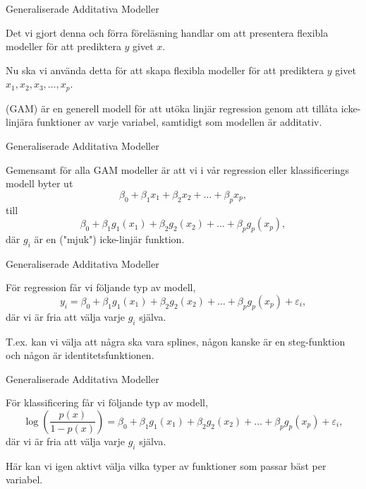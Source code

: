 \documentclass[10pt,english]{beamer}
\begin{document}
\begin{frame}{Generaliserade Additativa Modeller}

    Det vi gjort denna och förra föreläsning handlar om att presentera flexibla modeller för att prediktera $y$ givet $x$.
    
    Nu ska vi använda detta för att skapa flexibla modeller för att prediktera $y$ givet $x_1, x_2, x_3, \ldots, x_p$.

    \begin{greenbox}
         (GAM) är en generell modell för att utöka linjär regression genom att tillåta icke-linjära funktioner av varje variabel, samtidigt som modellen är additativ.
    \end{greenbox}
    
\end{frame}

\begin{frame}{Generaliserade Additativa Modeller}
    
    Gemensamt för alla GAM modeller är att vi i vår regression eller klassificerings modell byter ut
    \begin{equation*}
        \beta_0 + \beta_1 x_1 + \beta_2 x_2 + \ldots + \beta_p x_p,
    \end{equation*}
    till
    \begin{equation*}
        \beta_0 + \beta_1 g_1(x_1) + \beta_2 g_2(x_2) + \ldots + \beta_p g_p(x_p),
    \end{equation*}
    där $g_i$ är en ("mjuk") icke-linjär funktion.

\end{frame}

\begin{frame}{Generaliserade Additativa Modeller}
    
    För regression får vi följande typ av modell,
    \begin{equation*}
        y_i = \beta_0 + \beta_1 g_1(x_1) + \beta_2 g_2(x_2) + \ldots + \beta_p g_p(x_p) + \varepsilon_i,
    \end{equation*}
    där vi är fria att välja varje $g_i$ själva.

    T.ex. kan vi välja att några ska vara splines, någon kanske är en steg-funktion och någon är identitetsfunktionen.

\end{frame}

\begin{frame}{Generaliserade Additativa Modeller}
    
    För klassificering får vi följande typ av modell,
    \begin{equation*}
        \log\left(\frac{p(x)}{1 - p(x)}\right) = \beta_0 + \beta_1 g_1(x_1) + \beta_2 g_2(x_2) + \ldots + \beta_p g_p(x_p) + \varepsilon_i,
    \end{equation*}
    där vi är fria att välja varje $g_i$ själva.

    Här kan vi igen aktivt välja vilka typer av funktioner som passar bäst per variabel.

\end{frame}
\end{document}
